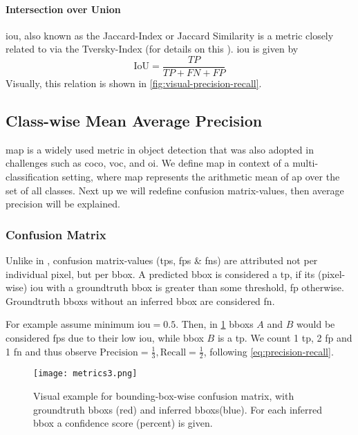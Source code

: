 \paragraph{Intersection over Union}\label{par:iou}
\Gls{iou}, also known as the Jaccard-Index or Jaccard Similarity is a metric
closely related to  via the Tversky-Index (for details on
this \cite[cf.][Section 6.3 Similarity Measures]{James.2011}). \Gls{iou} is 
given by
\begin{equation}
    \text{IoU}=\frac{TP}{TP + FN + FP}
\end{equation}
Visually, this relation is shown in \cref{fig:visual-precision-recall}.

\subsection{Class-wise Mean Average Precision}\label{subsect:mAP}
\Gls{map} is a widely used metric in object detection that was also adopted in
challenges such as \gls{coco}, \gls{voc}, and \gls{oi}. We define \gls{map} in
context of a multi-classification setting, where \gls{map} represents the
arithmetic mean of \gls{ap} over the set of all classes. Next up we will
redefine confusion matrix-values, then average precision will be explained.

\subsubsection{Confusion Matrix}
Unlike in , confusion matrix-values
(\glspl{tp}, \glspl{fp} \& \glspl{fn}) are attributed not per individual pixel,
but per \gls{bbox}. A predicted \gls{bbox} is considered a \gls{tp}, if its
(pixel-wise) \gls{iou} with a groundtruth \gls{bbox} is greater than some
threshold, \gls{fp} otherwise. Groundtruth \glspl{bbox} without an inferred
\gls{bbox} are considered \gls{fn}.
\par
For example assume minimum \gls{iou}\(=0.5\). Then, in
\cref{fig:bbox-precision-recall} \glspl{bbox} \(A\) and \(B\) would be considered
\glspl{fp} due to their low \gls{iou}, while \gls{bbox} \(B\) is a \gls{tp}.
We count 1 \gls{tp}, 2 \gls{fp} and 1 \gls{fn} and thus observe
\(\text{Precision} = \frac{1}{3}, \text{Recall} = \frac{1}{2}\), following
\cref{eq:precision-recall}.

\begin{figure}
    \center
    \texttt{[image: metrics3.png]}
    \caption{Visual example for bounding-box-wise confusion matrix, with
    groundtruth \glspl{bbox} (red) and inferred \glspl{bbox}(blue). For each
    inferred \gls{bbox} a confidence score (percent) is given.}\label{fig:bbox-precision-recall}
\end{figure}

